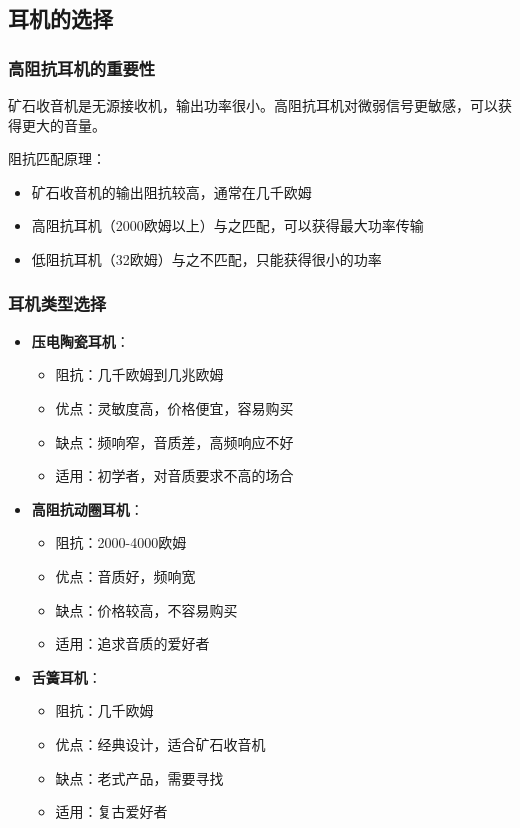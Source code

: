 \documentclass[12pt,UTF8]{ctexbook}
\begin{document}
\subsection{耳机的选择}

\subsubsection{高阻抗耳机的重要性}

矿石收音机是无源接收机，输出功率很小。高阻抗耳机对微弱信号更敏感，可以获得更大的音量。

阻抗匹配原理：
\begin{itemize}[leftmargin=3.5em]
    \item 矿石收音机的输出阻抗较高，通常在几千欧姆
    \item 高阻抗耳机（2000欧姆以上）与之匹配，可以获得最大功率传输
    \item 低阻抗耳机（32欧姆）与之不匹配，只能获得很小的功率
\end{itemize}

\subsubsection{耳机类型选择}

\begin{itemize}[leftmargin=3.5em]
    \item \textbf{压电陶瓷耳机}：
        \begin{itemize}[leftmargin=3.5em]
            \item 阻抗：几千欧姆到几兆欧姆
            \item 优点：灵敏度高，价格便宜，容易购买
            \item 缺点：频响窄，音质差，高频响应不好
            \item 适用：初学者，对音质要求不高的场合
        \end{itemize}
    \item \textbf{高阻抗动圈耳机}：
        \begin{itemize}[leftmargin=3.5em]
            \item 阻抗：2000-4000欧姆
            \item 优点：音质好，频响宽
            \item 缺点：价格较高，不容易购买
            \item 适用：追求音质的爱好者
        \end{itemize}
    \item \textbf{舌簧耳机}：
        \begin{itemize}[leftmargin=3.5em]
            \item 阻抗：几千欧姆
            \item 优点：经典设计，适合矿石收音机
            \item 缺点：老式产品，需要寻找
            \item 适用：复古爱好者
        \end{itemize}
\end{itemize}
\end{document}
